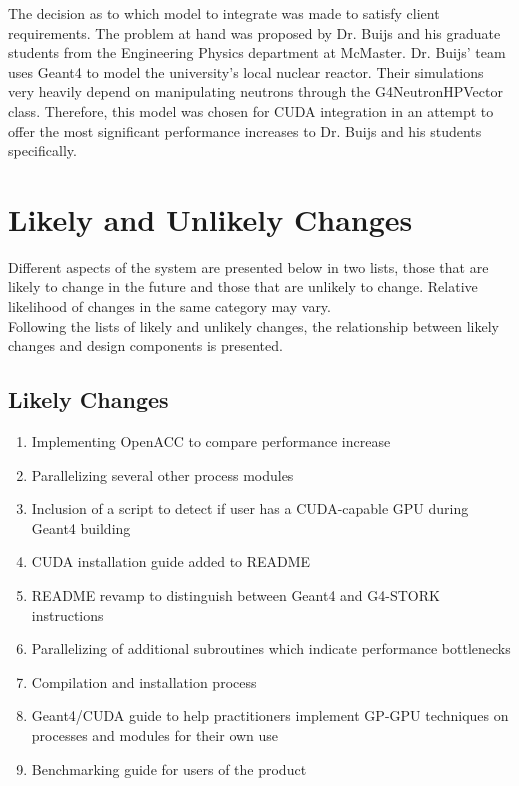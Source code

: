 \documentclass[12pt]{article}
\begin{document}
The decision as to which model to integrate was made to satisfy client requirements. The problem at hand was proposed by Dr. Buijs and his graduate students from the Engineering Physics department at McMaster. Dr. Buijs' team uses Geant4 to model the university's local nuclear reactor. Their simulations very heavily depend on manipulating neutrons through the G4NeutronHPVector class. Therefore, this model was chosen for CUDA integration in an attempt to offer the most significant performance increases to Dr. Buijs and his students specifically.\\

\section{Likely and Unlikely Changes}
Different aspects of the system are presented below in two lists, those that are likely to change in the future and those that are unlikely to change. Relative likelihood of changes in the same category may vary.\\

Following the lists of likely and unlikely changes, the relationship between likely changes and design components is presented.

\subsection{Likely Changes} %
\begin{enumerate}
\item Implementing OpenACC to compare performance increase
\item Parallelizing several other process modules
\item Inclusion of a script to detect if user has a CUDA-capable GPU during Geant4 building
\item CUDA installation guide added to README
\item README revamp to distinguish between Geant4 and G4-STORK instructions
\item Parallelizing of additional subroutines which indicate performance bottlenecks
\item Compilation and installation process
\item Geant4/CUDA guide to help practitioners implement GP-GPU techniques on processes and modules for their own use
\item Benchmarking guide for users of the product
\end{enumerate}
\end{document}
